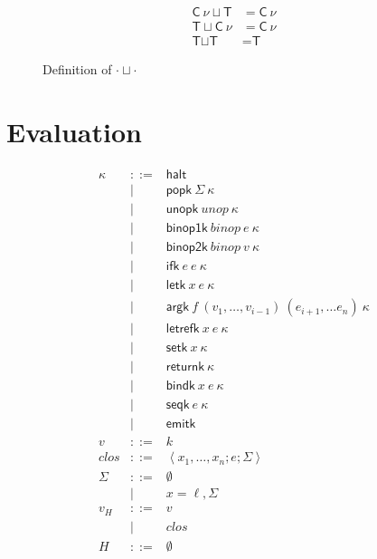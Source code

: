 \documentclass[twocolumn]{article}
\newcommand{\bnfdef}{::=}
\newcommand{\bnfalt}{\mathrel{\mid}}
\newcommand{\kw}[1]{\textsf{#1}}
\newcommand{\join}[2]{#1 \sqcup #2}
\newcommand{\clos}[3]{\left<#1; #2; #3\right>}
\begin{document}
\begin{figure}
\begin{align*}
\join{\kw{C}~ \nu}{\kw{T}} &= \kw{C}~ \nu \\
\join{\kw{T}}{\kw{C}~ \nu} &= \kw{C}~ \nu \\
\join{\kw{T}}{\kw{T}}      &= \kw{T}
\end{align*}
\caption{Definition of $\join{\cdot}{\cdot}$}
\label{def:join}
\end{figure}

\section{Evaluation}

\begin{figure}
\begin{equation*}
\begin{array}{lcl}
  \kappa
     & \bnfdef & \kw{halt} \\
     & \bnfalt & \kw{popk}~ \Sigma~ \kappa \\
     & \bnfalt & \kw{unopk}~ unop~ \kappa \\
     & \bnfalt & \kw{binop1k}~ binop~ e~ \kappa \\
     & \bnfalt & \kw{binop2k}~ binop~ v~ \kappa  \\
     & \bnfalt & \kw{ifk}~ e~ e~ \kappa \\
     & \bnfalt & \kw{letk}~ x~ e~ \kappa \\
     & \bnfalt & \kw{argk}~ f~ (v_1, \ldots, v_{i-1})~ (e_{i+1}, \ldots e_n)~ \kappa \\
     & \bnfalt & \kw{letrefk}~ x~ e~ \kappa \\
     & \bnfalt & \kw{setk}~ x~ \kappa \\
     & \bnfalt & \kw{returnk}~ \kappa \\
     & \bnfalt & \kw{bindk}~ x~ e~ \kappa \\
     & \bnfalt & \kw{seqk}~ e~ \kappa \\
     & \bnfalt & \kw{emitk} \\
  v
     & \bnfdef & k \\
  clos
     & \bnfdef & \clos{x_1, \ldots, x_n}{e}{\Sigma} \\
  \Sigma
     & \bnfdef & \emptyset \\
     & \bnfalt & x = \ell, \Sigma \\
  v_H
     & \bnfdef & v \\
     & \bnfalt & clos \\
  H
     & \bnfdef & \emptyset \\

\end{array}
\end{equation*}
\end{figure}
\end{document}
